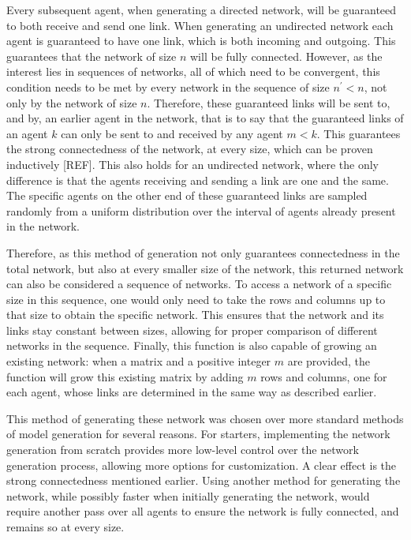 \documentclass{article}
\begin{document}
Every subsequent agent, when generating a directed network, will be guaranteed to both receive and send one link. When generating an undirected network each agent is guaranteed to have one link, which is both incoming and outgoing. This guarantees that the network of size $n$ will be fully connected. However, as the interest lies in sequences of networks, all of which need to be convergent, this condition needs to be met by every network in the sequence of size $n^{\prime} < n$, not only by the network of size $n$. Therefore, these guaranteed links will be sent to, and by, an earlier agent in the network, that is to say that the guaranteed links of an agent $k$ can only be sent to and received by any agent $m < k$. This guarantees the strong connectedness of the network, at every size, which can be proven inductively [REF]. This also holds for an undirected network, where the only difference is that the agents receiving and sending a link are one and the same. The specific agents on the other end of these guaranteed links are sampled randomly from a uniform distribution over the interval of agents already present in the network. \newline

Therefore, as this method of generation not only guarantees connectedness in the total network, but also at every smaller size of the network, this returned network can also be considered a sequence of networks. To access a network of a specific size in this sequence, one would only need to take the rows and columns up to that size to obtain the specific network. This ensures that the network and its links stay constant between sizes, allowing for proper comparison of different networks in the sequence. Finally, this function is also capable of growing an existing network: when a matrix and a positive integer $m$ are provided, the function will grow this existing matrix by adding $m$ rows and columns, one for each agent, whose links are determined in the same way as described earlier.\newline

This method of generating these network was chosen over more standard methods of model generation for several reasons. For starters, implementing the network generation from scratch provides more low-level control over the network generation process, allowing more options for customization. A clear effect is the strong connectedness mentioned earlier. Using another method for generating the network, while possibly faster when initially generating the network, would require another pass over all agents to ensure the network is fully connected, and remains so at every size. 
\end{document}

